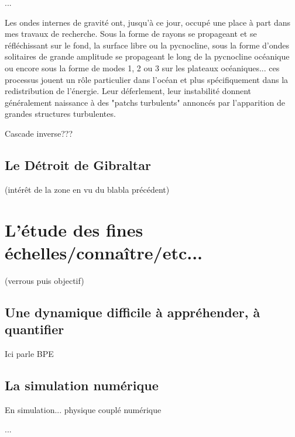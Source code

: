...

Les ondes internes de gravité ont, jusqu'à ce jour, occupé une place à part dans mes travaux de recherche. Sous la forme de rayons se propageant et se réfléchissant sur le fond, la surface libre ou la pycnocline, sous la forme d'ondes solitaires de grande amplitude se propageant le long de la pycnocline océanique ou encore sous la forme de modes 1, 2 ou 3 sur les plateaux océaniques... ces processus jouent un rôle particulier dans l'océan et plus spécifiquement dans la redistribution de l'énergie. Leur déferlement, leur instabilité donnent généralement naissance à des "patchs turbulents" annoncés par l'apparition de grandes structures turbulentes.

Cascade inverse???

\subsection{Le Détroit de Gibraltar}
(intérêt de la zone en vu du blabla précédent)



\section{L'étude des fines échelles/connaître/etc...}
(verrous puis objectif)
\subsection{Une dynamique difficile à appréhender, à quantifier}
Ici parle BPE

\subsection{La simulation numérique}
En simulation... physique couplé numérique

...

